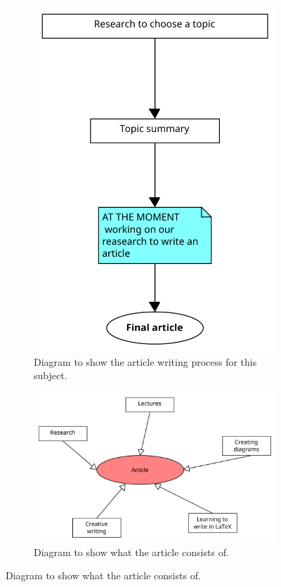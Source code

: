\documentclass[10pt,twocolumn,twoside,slovak,a4paper]{article}
\begin{document}
\begin{figure}
\begin{subfigure}{0.5\textwidth}
\centering
\includegraphics[scale=0.5]{diagram1.pdf}
\caption{Diagram to show the article writing process for this subject.}
\label{f:diagram1}
\end{subfigure}
\begin{subfigure}{0.5\textwidth}
\centering
\includegraphics[scale=0.5]{diagram2.pdf}
\caption{Diagram to show what the article consists of.}
\label{f:diagram2}
\end{subfigure}
\end{figure}
\end{document}
